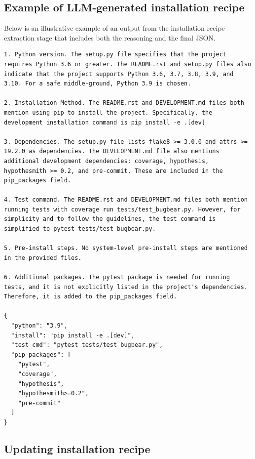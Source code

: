 \documentclass[dandb]{article}
\begin{document}
\subsection{Example of LLM-generated installation recipe}
\label{appendix:json_recipe_example}

Below is an illustrative example of an output from the installation recipe extraction stage that includes both the reasoning and the final JSON.

\begin{lstlisting}[upquote=true,caption=LLM-generated installation recipe]
1. Python version. The setup.py file specifies that the project requires Python 3.6 or greater. The README.rst and setup.py files also indicate that the project supports Python 3.6, 3.7, 3.8, 3.9, and 3.10. For a safe middle-ground, Python 3.9 is chosen. 

2. Installation Method. The README.rst and DEVELOPMENT.md files both mention using pip to install the project. Specifically, the development installation command is pip install -e .[dev]

3. Dependencies. The setup.py file lists flake8 >= 3.0.0 and attrs >= 19.2.0 as dependencies. The DEVELOPMENT.md file also mentions additional development dependencies: coverage, hypothesis, hypothesmith >= 0.2, and pre-commit. These are included in the pip_packages field.

4. Test command. The README.rst and DEVELOPMENT.md files both mention running tests with coverage run tests/test_bugbear.py. However, for simplicity and to follow the guidelines, the test command is simplified to pytest tests/test_bugbear.py.

5. Pre-install steps. No system-level pre-install steps are mentioned in the provided files.

6. Additional packages. The pytest package is needed for running tests, and it is not explicitly listed in the project's dependencies. Therefore, it is added to the pip_packages field.

{
  "python": "3.9",
  "install": "pip install -e .[dev]",
  "test_cmd": "pytest tests/test_bugbear.py",
  "pip_packages": [
    "pytest",
    "coverage",
    "hypothesis",
    "hypothesmith>=0.2",
    "pre-commit"
  ]
}   
\end{lstlisting}


\subsection{Updating installation recipe}
\end{document}
